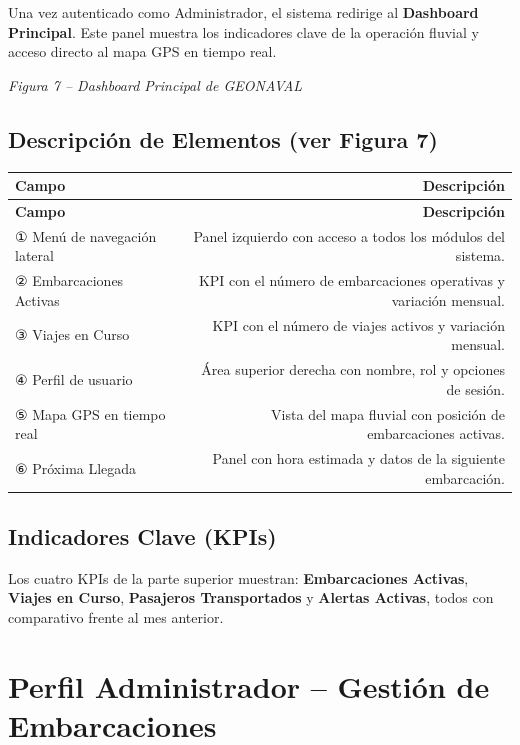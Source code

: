 \documentclass[12pt,a4paper]{article}
\begin{document}
Una vez autenticado como Administrador, el sistema redirige al \textbf{Dashboard Principal}. Este panel muestra los indicadores clave de la operación fluvial y acceso directo al mapa GPS en tiempo real.

\textit{Figura 7 -- Dashboard Principal de GEONAVAL}

\subsection{Descripción de Elementos (ver Figura 7)}

\begin{longtable}{LR}
  \toprule
  \textbf{Campo} & \textbf{Descripción} \\
  \midrule
  \endfirsthead
  \toprule
  \textbf{Campo} & \textbf{Descripción} \\
  \midrule
  \endhead
  \bottomrule
  \endfoot
  ① Menú de navegación lateral & Panel izquierdo con acceso a todos los módulos del sistema. \\[4pt]
  ② Embarcaciones Activas      & KPI con el número de embarcaciones operativas y variación mensual. \\[4pt]
  ③ Viajes en Curso            & KPI con el número de viajes activos y variación mensual. \\[4pt]
  ④ Perfil de usuario          & Área superior derecha con nombre, rol y opciones de sesión. \\[4pt]
  ⑤ Mapa GPS en tiempo real   & Vista del mapa fluvial con posición de embarcaciones activas. \\[4pt]
  ⑥ Próxima Llegada           & Panel con hora estimada y datos de la siguiente embarcación. \\
\end{longtable}

\subsection{Indicadores Clave (KPIs)}

Los cuatro KPIs de la parte superior muestran: \textbf{Embarcaciones Activas}, \textbf{Viajes en Curso}, \textbf{Pasajeros Transportados} y \textbf{Alertas Activas}, todos con comparativo frente al mes anterior.

\section{Perfil Administrador -- Gestión de Embarcaciones}
\end{document}
